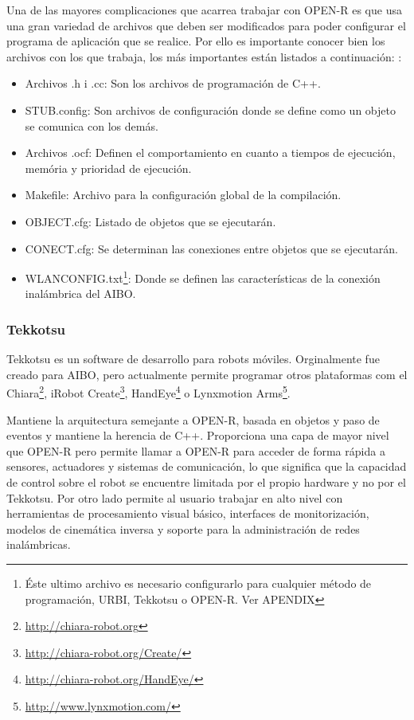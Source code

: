 \documentclass[12pt,a4paper,final,twoside]{article}
\begin{document}
Una de las mayores complicaciones que acarrea trabajar con OPEN-R es que usa una gran variedad de archivos que deben ser modificados para poder configurar el programa de aplicación que se realice. Por ello es importante conocer bien los archivos con los que trabaja, los más importantes están listados a continuación: 
:
\begin{itemize}
\item Archivos .h i .cc: Son los archivos de programación de C++.
\item STUB.config: Son archivos de configuración donde se define como un objeto se comunica con los demás.
\item Archivos .ocf: Definen el comportamiento en cuanto a tiempos de ejecución, memória y prioridad de ejecución.
\item Makefile: Archivo para la configuración global de la compilación.
\item OBJECT.cfg: Listado de objetos que se ejecutarán.
\item CONECT.cfg: Se determinan las conexiones entre objetos que se ejecutarán.
\item WLANCONFIG.txt\footnote{Éste ultimo archivo es necesario configurarlo para cualquier método de programación, URBI, Tekkotsu o OPEN-R. Ver APENDIX}: Donde se definen las características de la conexión inalámbrica del AIBO.
\end{itemize}

\subsubsection{Tekkotsu}
Tekkotsu es un software de desarrollo para robots móviles. Orginalmente fue creado para AIBO, pero actualmente permite programar otros plataformas com el Chiara\footnote{\url{http://chiara-robot.org}}, iRobot Create\footnote{\url{http://chiara-robot.org/Create/}}, HandEye\footnote{\url{http://chiara-robot.org/HandEye/}} o Lynxmotion Arms\footnote{\url{http://www.lynxmotion.com/}}.


Mantiene la arquitectura semejante a OPEN-R, basada en objetos y paso de eventos y mantiene la herencia de C++. Proporciona una capa de mayor nivel que OPEN-R pero permite llamar a OPEN-R para acceder de forma rápida a sensores, actuadores y sistemas de comunicación, lo que significa que la capacidad de control sobre el robot se encuentre limitada por el propio hardware y no por el Tekkotsu. Por otro lado permite al usuario trabajar en alto nivel con herramientas de procesamiento visual básico, interfaces de monitorización, modelos de cinemática inversa y soporte para la administración de redes inalámbricas.
 
\end{document}
